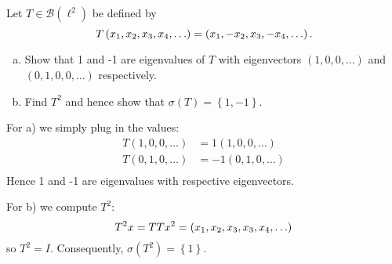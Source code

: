 \documentclass{homework}
\begin{document}
  \begin{problemtext}
      Let $T \in \mathcal{B}(\ell^2)$ be defined by
      \begin{equation}
          \notag
          T \left( x_1, x_2, x_3, x_4, \ldots \right) = \left( x_1, -x_2, x_3, -x_4, \ldots \right).
      \end{equation}
      \begin{enumerate}[a)]
          \item Show that 1 and -1 are eigenvalues of $T$ with eigenvectors
              $\left( 1, 0, 0, \ldots \right)$ and $\left( 0, 1, 0, 0, \ldots
              \right)$ respectively.
          \item Find $T^2$ and hence show that $\sigma(T) = \left\{ 1, -1 \right\}$.
    \end{enumerate}
  \end{problemtext}
  \begin{solution}
      For a) we simply plug in the values:
      \begin{align*}
          T \left( 1, 0, 0, \ldots \right) &= 1\left( 1, 0, 0, \ldots \right) \\
          T \left( 0, 1, 0, \ldots \right) &= -1\left( 0, 1, 0, \ldots \right) \\
      \end{align*}
      Hence 1 and -1 are eigenvalues with respective eigenvectors.

      For b) we compute $T^2$:
      \begin{equation}
          \notag
          T^2x = TTx^2 = \left( x_1, x_2, x_3, x_3, x_4, \ldots \right)
      \end{equation}
      so $T^2 = I$. Consequently, $\sigma(T^2) = \left\{ 1 \right\}$.

  \end{solution}
\end{document}
